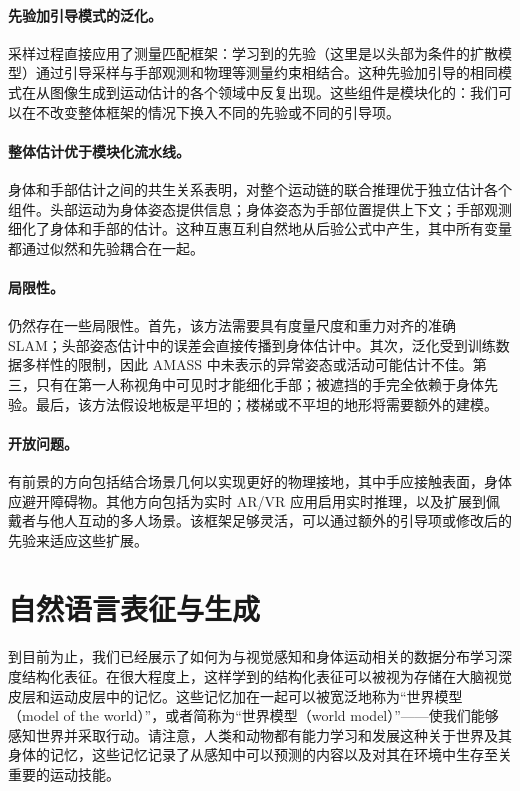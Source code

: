 \documentclass[../../book-main_zh.tex]{subfiles}
\begin{document}
\paragraph{先验加引导模式的泛化。}
采样过程直接应用了测量匹配框架：学习到的先验（这里是以头部为条件的扩散模型）通过引导采样与手部观测和物理等测量约束相结合。这种先验加引导的相同模式在从图像生成到运动估计的各个领域中反复出现。这些组件是模块化的：我们可以在不改变整体框架的情况下换入不同的先验或不同的引导项。

\paragraph{整体估计优于模块化流水线。}
身体和手部估计之间的共生关系表明，对整个运动链的联合推理优于独立估计各个组件。头部运动为身体姿态提供信息；身体姿态为手部位置提供上下文；手部观测细化了身体和手部的估计。这种互惠互利自然地从后验公式中产生，其中所有变量都通过似然和先验耦合在一起。

\paragraph{局限性。}
仍然存在一些局限性。首先，该方法需要具有度量尺度和重力对齐的准确 SLAM；头部姿态估计中的误差会直接传播到身体估计中。其次，泛化受到训练数据多样性的限制，因此 AMASS 中未表示的异常姿态或活动可能估计不佳。第三，只有在第一人称视角中可见时才能细化手部；被遮挡的手完全依赖于身体先验。最后，该方法假设地板是平坦的；楼梯或不平坦的地形将需要额外的建模。

\paragraph{开放问题。}
有前景的方向包括结合场景几何以实现更好的物理接地，其中手应接触表面，身体应避开障碍物。其他方向包括为实时 AR/VR 应用启用实时推理，以及扩展到佩戴者与他人互动的多人场景。该框架足够灵活，可以通过额外的引导项或修改后的先验来适应这些扩展。




\section{自然语言表征与生成}\label{sec:clm_text}
到目前为止，我们已经展示了如何为与视觉感知和身体运动相关的数据分布学习深度结构化表征。在很大程度上，这样学到的结构化表征可以被视为存储在大脑视觉皮层和运动皮层中的记忆。这些记忆加在一起可以被宽泛地称为“世界模型（model of the world）”，或者简称为“世界模型（world model）”——使我们能够感知世界并采取行动。请注意，人类和动物都有能力学习和发展这种关于世界及其身体的记忆，这些记忆记录了从感知中可以预测的内容以及对其在环境中生存至关重要的运动技能。
\end{document}
